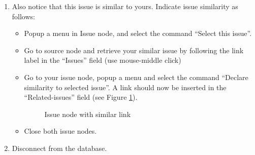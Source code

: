 \begin{enumerate}
\begin{itemize}
  \end{itemize} 
\item Also notice that this issue is similar to yours.
Indicate issue similarity as follows:
\begin {itemize}
  \item Popup a menu in Issue node, and select the command ``Select this
issue''. 
  \item Go to source node and retrieve your similar issue  by following
  the link label in the  ``Issues'' field (use mouse-middle click)
  \item Go to your issue node, popup a menu and select the command
    ``Declare similarity to selected issue''. A link should now be
    inserted in the ``Related-issues'' field (see Figure
    \ref{similar-issue}).
\begin{figure}[htb]
  {\centerline{}}
  \caption{Issue node with similar link}
  \label{similar-issue}
\end{figure}
 
  \item Close both issue nodes.
\end {itemize}
\item Disconnect from the database.
\end{enumerate}

